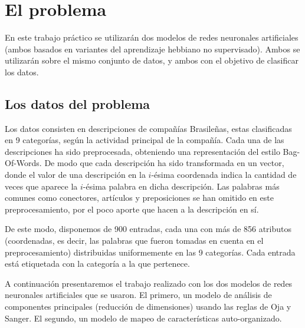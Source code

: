 \section{El problema}
En este trabajo práctico se utilizarán dos modelos de redes neuronales artificiales 
(ambos basados en variantes del aprendizaje hebbiano no supervisado). Ambos se utilizarán 
sobre el mismo conjunto de datos, y ambos con el objetivo de clasificar los datos. 

\subsection{Los datos del problema}
Los datos consisten en descripciones de compañías Brasileñas, estas clasificadas en 9 categorías, 
según la actividad principal de la compañía. Cada una de las descripciones ha sido preprocesada, 
obteniendo una representación del estilo Bag-Of-Words. De modo que cada descripción ha sido 
transformada en un vector, donde el valor de una descripción en la $i$-ésima coordenada indica la cantidad de 
veces que aparece la $i$-ésima palabra en dicha descripción. Las palabras más comunes como conectores, 
artículos y preposiciones se han omitido en este preprocesamiento, por el poco aporte que hacen 
a la descripción en sí. 

De este modo, disponemos de 900 entradas, cada una con más de 856 atributos (coordenadas, es decir, 
las palabras que fueron tomadas en cuenta en el preprocesamiento) distribuidas uniformemente en las 9 categorías. 
Cada entrada está etiquetada con la categoría a la que pertenece. 

A continuación presentaremos el trabajo realizado con los dos modelos de 
redes neuronales artificiales que se usaron. El primero, un modelo de análisis de 
componentes principales (reducción de dimensiones) usando las reglas de Oja y Sanger. El segundo, 
un modelo de mapeo de características auto-organizado. 
